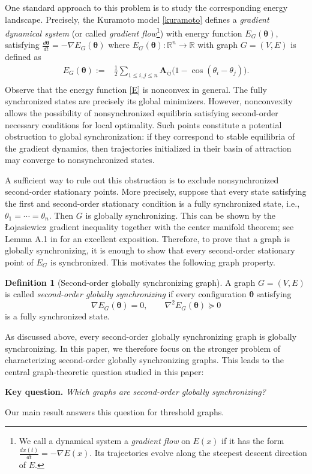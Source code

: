 \documentclass[11pt,reqno]{amsart}
\theoremstyle{definition}
\newtheorem{definition}[theorem]{Definition}
\begin{document}
One standard approach to this problem is to study the corresponding energy landscape.
Precisely, the Kuramoto model \eqref{kuramoto} defines a \textit{gradient dynamical system} (or called \textit{gradient flow}\footnote{We call a dynamical system a \emph{gradient flow} on $E(x)$ if it has the form $\frac{dx(t)}{dt} = -\nabla E(x)$. Its trajectories evolve along the steepest descent direction of $E$.}) with energy function \( E_G (\boldsymbol{\theta})\), satisfying
$\frac{d\boldsymbol{\theta}}{dt} = -\nabla E_G(\boldsymbol{\theta})$ where \( E_G(\boldsymbol{\theta}) : \mathbb R^n \rightarrow \mathbb{R} \) with graph \( G=(V,E) \) is defined as
\begin{equation}\label{E}
\begin{aligned}
    E_G(\boldsymbol\theta) := &\frac{1}{2} \sum_{1\leq i,j\leq n} \boldsymbol{A}_{ij} \big(1-\cos(\theta_i - \theta_j)\big). \\
    \end{aligned}
\end{equation}
Observe that the energy function \eqref{E} is nonconvex in general. The fully synchronized states are precisely its global minimizers. However, nonconvexity allows the possibility of nonsynchronized equilibria satisfying second-order necessary conditions for local optimality. Such points constitute a potential obstruction to global synchronization: if they correspond to stable equilibria of the gradient dynamics, then trajectories initialized in their basin of attraction may converge to nonsynchronized states.

A sufficient way to rule out this obstruction is to exclude nonsynchronized second-order stationary points. More precisely, suppose that every state satisfying the first and second-order stationary condition is a fully synchronized state, i.e., $\theta_1=\cdots=\theta_n$. Then \(G\) is globally synchronizing. This can be shown by the Łojasiewicz gradient inequality \cite{Lageman2007} together with the center manifold theorem; see Lemma A.1 in \cite{Geshkovski2025} for an excellent exposition. Therefore, to prove that a graph is globally synchronizing, it is enough to show that every second-order stationary point of \(E_G\) is synchronized.
This motivates the following graph property.

\begin{definition}[Second-order globally synchronizing graph]\label{defi-second-order-gs}
A graph \(G=(V,E)\) is called \emph{second-order globally synchronizing} if every
configuration \(\boldsymbol{\theta}\) satisfying
\[
    \nabla E_G(\boldsymbol{\theta})=0,
    \qquad
    \nabla^2 E_G(\boldsymbol{\theta})\succeq 0
\]
is a fully synchronized state.
\end{definition}
As discussed above, every second-order globally synchronizing graph is globally
synchronizing. In this paper, we therefore focus on the stronger problem of
characterizing second-order globally synchronizing graphs. This leads to the
central graph-theoretic question studied in this paper:
\begin{center}
\textbf{Key question.}
\emph{Which graphs are second-order globally synchronizing?}
\end{center}
Our main result answers this question for threshold graphs.
\end{document}
